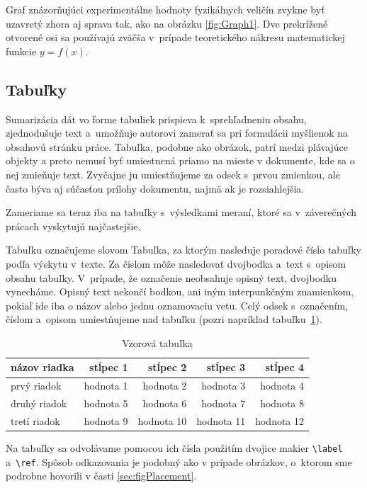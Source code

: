 Graf znázorňujúci experimentálne hodnoty fyzikálnych veličín 
zvykne byť uzavretý zhora aj sprava tak,
ako na obrázku \ref{fig:Graph1}.
Dve prekrížené otvorené osi sa používajú zväčša
v~prípade teoretického nákresu matematickej funkcie $y = f(x)$.

\subsection{Tabuľky}
Sumarizácia dát vo forme tabuliek prispieva
k~sprehľadneniu obsahu, zjednodušuje text
a~umožňuje autorovi zamerať sa pri formulácii myšlienok na 
obsahovú stránku práce.
Tabuľka, podobne ako obrázok, patrí medzi plávajúce objekty
a preto nemusí byť umiestnená priamo na mieste v dokumente,
kde sa o nej zmieňuje text.
Zvyčajne ju umiestňujeme za odsek s~prvou zmienkou,
ale často býva aj súčasťou prílohy dokumentu,
najmä ak je rozsiahlejšia.

Zameriame sa teraz iba na tabuľky s~výsledkami meraní,
ktoré sa v~záverečných prácach vyskytujú najčastejšie. 

Tabuľku označujeme slovom Tabuľka,
za ktorým nasleduje poradové číslo tabuľky podľa výskytu
v~texte.
Za číslom môže nasledovať dvojbodka a~text s~opisom obsahu 
tabuľky.
V~prípade, že označenie neobsahuje opisný text,
dvojbodku vynecháme.
Opisný text nekončí bodkou,
ani iným interpunkčným znamienkom,
pokiaľ ide iba o názov alebo jednu oznamovaciu vetu.
Celý odsek s~označením, číslom a~opisom umiestňujeme
nad tabuľku (pozri napríklad tabuľku~\ref{tab:template}).

\begin{table}[h!]
  \caption{Vzorová tabuľka}
  \label{tab:template}
  \centering
  \begin{tabular}{@{}lrrrr@{}}
    \toprule
    \textbf{názov riadka} & \textbf{stĺpec 1} & \textbf{stĺpec 2} & \textbf{stĺpec 3} & \textbf{stĺpec 4} \\
    \midrule
    prvý riadok & hodnota 1 & hodnota 2 & hodnota 3 & hodnota 4\\
    druhý riadok & hodnota 5 & hodnota 6 & hodnota 7 & hodnota 8\\
    tretí riadok & hodnota 9 & hodnota 10 & hodnota 11 & hodnota 12\\
    \bottomrule
  \end{tabular}
\end{table}

Na tabuľky sa odvolávame pomocou ich čísla použitím dvojice makier 
\verb|\label| a~\verb|\ref|.
Spôsob odkazovania je podobný ako v prípade obrázkov,
o~ktorom sme podrobne hovorili v časti \ref{sec:figPlacement}.

